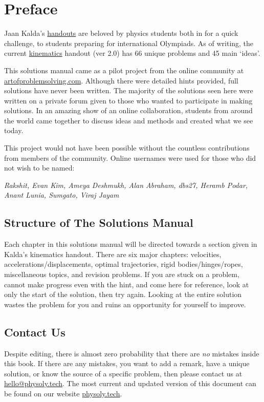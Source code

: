 \documentclass[11pt]{article}
\begin{document}
\section*{Preface}
\vspace{-5mm}
\indent Jaan Kalda's \href{https://www.ioc.ee/~kalda/ipho/}{handouts} are beloved by physics students both in for a quick challenge, to students preparing for international Olympiads. As of writing, the current \href{https://www.ioc.ee/~kalda/ipho/kin_ENG.pdf}{kinematics} handout (ver 2.0) has 66 unique problems and 45 main `ideas'.

This solutions manual came as a pilot project from the online community at \href{https://artofproblemsolving.com}{artofproblemsolving.com}. Although there were detailed hints provided, full solutions have never been written. The majority of the solutions seen here were written on a private forum given to those who wanted to participate in making solutions. In an amazing show of an online collaboration, students from around the world came together to discuss ideas and methods and created what we see today.

This project would not have been possible without the countless contributions from members of the community. Online usernames were used for those who did not wish to be named: 

\textit{Rakshit, Evan Kim, Ameya Deshmukh, Alan Abraham, dbs27, Heramb Podar, Anant Lunia, Sumgato, Viraj Jayam} %
\subsection*{Structure of The Solutions Manual}
\vspace{-5mm}
Each chapter in this solutions manual will be directed towards a section given in Kalda's kinematics handout. There are six major chapters: velocities, accelerations/displacements, optimal trajectories, rigid bodies/hinges/ropes, miscellaneous topics, and revision problems. If you are stuck on a problem, cannot make progress even with the hint, and come here for reference, look at only the start of the solution, then try again. Looking at the entire solution wastes the problem for you and ruins an opportunity for yourself to improve.

\subsection*{Contact Us}
\vspace{-5mm}
Despite editing, there is almost zero probability that there are \textit{no} mistakes inside this book. If there are any mistakes, you want to add a remark, have a unique solution, or know the source of a specific problem, then please contact us at \href{mailto:hello@physoly.tech}{hello@physoly.tech}. The most current and updated version of this document can be found on our website \href{https://physoly.tech/}{physoly.tech}.
\end{document}
